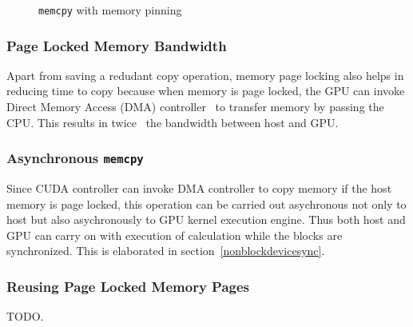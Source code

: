 \begin{figure}[h] %
  \caption{\texttt{memcpy} with memory pinning}\label{fig:w_mem_pin}
\end{figure}

\subsubsection{Page Locked Memory Bandwidth}
Apart from saving a redudant copy operation, memory page locking also helps in
reducing time to copy because when memory is page locked, the GPU can invoke Direct
Memory Access (DMA)
controller~\cite{dmatransfer}\cite{whypinnedfast}\cite{teslaspecs}\cite{teslakspecs}
to transfer memory by passing the CPU. This results in
twice~\cite{datatransferoptimization} the bandwidth between host and GPU.

\subsubsection{Asynchronous \texttt{memcpy}}
Since CUDA controller can invoke DMA controller to copy memory if the host memory
is page locked, this operation can be carried out asychronous not only to host but
also asychronously to GPU kernel execution engine. Thus both host and GPU can carry
on with execution of calculation while the blocks are synchronized. This is
elaborated in section~\ref{nonblockdevicesync}.

\subsubsection{Reusing Page Locked Memory Pages}
TODO.

